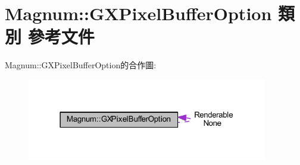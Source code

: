 \hypertarget{class_magnum_1_1_g_x_pixel_buffer_option}{}\section{Magnum\+:\+:G\+X\+Pixel\+Buffer\+Option 類別 參考文件}
\label{class_magnum_1_1_g_x_pixel_buffer_option}


Magnum\+:\+:G\+X\+Pixel\+Buffer\+Option的合作圖\+:\nopagebreak
\begin{figure}[H]
\begin{center}
\leavevmode
\includegraphics[width=298pt]{class_magnum_1_1_g_x_pixel_buffer_option__coll__graph}
\end{center}
\end{figure}
